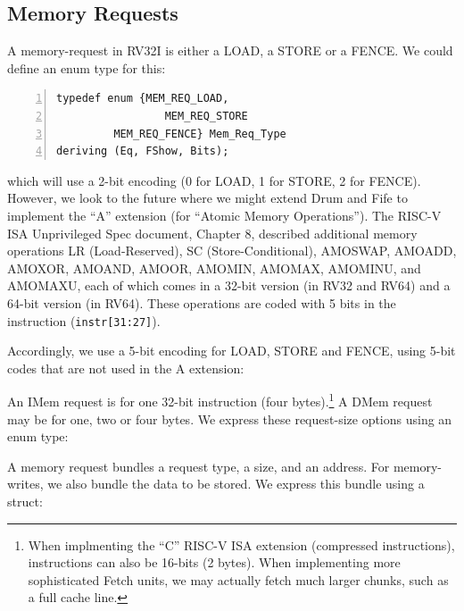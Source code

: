 
\subsection{Memory Requests}

\label{Sec_Mem_Req}


A memory-request in RV32I is either a LOAD, a STORE or a FENCE.  We
could define an enum type for this:

{\small
\begin{Verbatim}[frame=single, numbers=left]
   typedef enum {MEM_REQ_LOAD,
                 MEM_REQ_STORE
		 MEM_REQ_FENCE} Mem_Req_Type
deriving (Eq, FShow, Bits);
\end{Verbatim}
}

which will use a 2-bit encoding (0 for LOAD, 1 for STORE, 2 for
FENCE).  However, we look to the future where we might extend Drum and
Fife to implement the ``A'' extension (for ``Atomic Memory
Operations'').  The RISC-V ISA Unprivileged Spec document, Chapter 8,
described additional memory operations LR (Load-Reserved), SC
(Store-Conditional), AMOSWAP, AMOADD, AMOXOR, AMOAND, AMOOR, AMOMIN,
AMOMAX, AMOMINU, and AMOMAXU, each of which comes in a 32-bit version
(in RV32 and RV64) and a 64-bit version (in RV64).  These operations
are coded with 5 bits in the instruction (\verb|instr[31:27]|).

Accordingly, we use a 5-bit encoding for LOAD, STORE and FENCE, using
5-bit codes that are not used in the A extension:



An IMem request is for one 32-bit instruction (four
bytes).\footnote{When implmenting the ``C'' RISC-V ISA extension
(compressed instructions), instructions can also be 16-bits (2 bytes).
When implementing more sophisticated Fetch units, we may actually
fetch much larger chunks, such as a full cache line.}  A DMem request
may be for one, two or four bytes.  We express these request-size
options using an enum type:



A memory request bundles a request type, a size, and an address.  For
memory-writes, we also bundle the data to be stored.  We express this
bundle using a struct:



